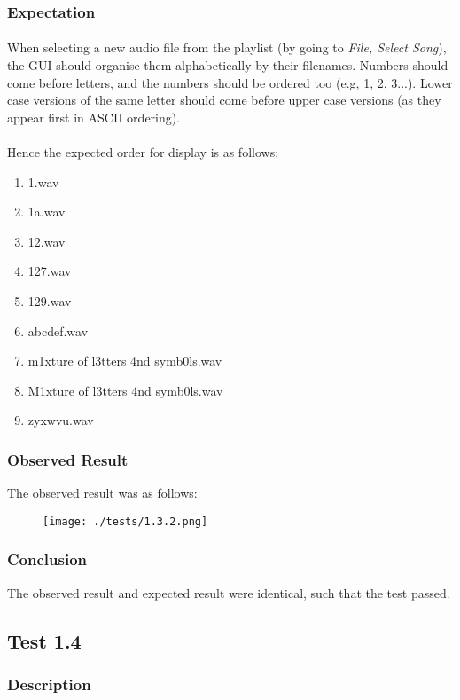 \subsubsection{Expectation}
\paragraph{}
When selecting a new audio file from the playlist (by going to \textit{File, Select Song}), the GUI should organise them alphabetically by their filenames. Numbers should come before letters, and the numbers should be ordered too (e.g, 1, 2, 3...). Lower case versions of the same letter should come before upper case versions (as they appear first in ASCII ordering).
\paragraph{}
Hence the expected order for display is as follows:
\begin{enumerate}
	\item 1.wav
	\item 1a.wav
	\item 12.wav
	\item 127.wav
	\item 129.wav
	\item abcdef.wav
	\item m1xture of l3tters 4nd symb0ls.wav
	\item M1xture of l3tters 4nd symb0ls.wav
	\item zyxwvu.wav
\end{enumerate}

\subsubsection{Observed Result}
The observed result was as follows:
\begin{figure}[H]
	\texttt{[image: ./tests/1.3.2.png]}
\end{figure}

\subsubsection{Conclusion}
The observed result and expected result were identical, such that the test passed.


\pagebreak
\subsection{Test 1.4}
\subsubsection{Description}
